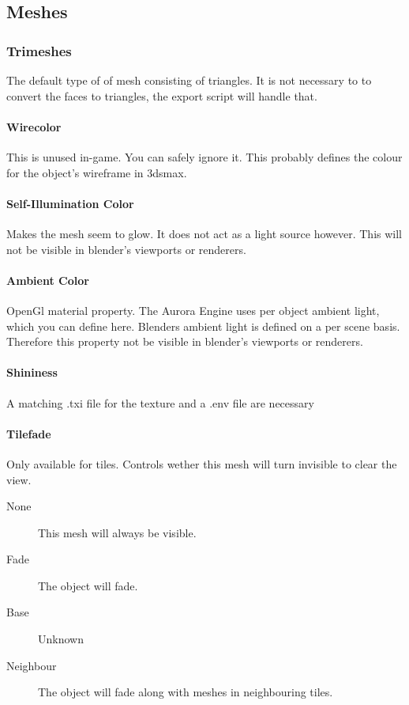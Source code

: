 \subsection{Meshes}

\subsubsection{Trimeshes}
The default type of of mesh consisting of triangles. It is not necessary to
to convert the faces to triangles, the export script will handle that.

\paragraph*{Wirecolor}
This is unused in-game. You can safely ignore it. This probably defines the
colour for the object's wireframe in 3dsmax.

\paragraph*{Self-Illumination Color}
Makes the mesh seem to glow. It does not act as a light source however.
This will not be visible in blender's viewports or renderers.

\paragraph*{Ambient Color}
OpenGl material property. The Aurora Engine uses per object ambient light,
which you can define here. Blenders ambient light is defined on a per scene
basis. Therefore this property not be visible in blender's viewports or
renderers.

\paragraph*{Shininess}
A matching .txi file for the texture and a .env file are necessary

\paragraph*{Tilefade}
Only available for tiles. Controls wether this mesh will turn invisible to
clear the view.
\begin{description}
    \item[None] This mesh will always be visible.
    \item[Fade] The object will fade.
    \item[Base] Unknown
    \item[Neighbour] The object will fade along with meshes in neighbouring tiles.
\end{description}

